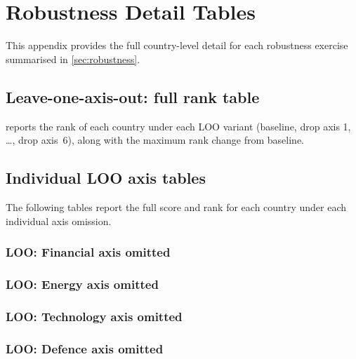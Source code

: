\section{Robustness Detail Tables}\label{app:robustness}

This appendix provides the full country-level detail for each
robustness exercise summarised in \cref{sec:robustness}.

\subsection{Leave-one-axis-out: full rank table}

 reports the rank of each country under each
LOO variant (baseline, drop axis 1, \ldots, drop axis~6), along with
the maximum rank change from baseline.



\subsection{Individual LOO axis tables}

The following tables report the full score and rank for each country
under each individual axis omission.

\subsubsection{LOO: Financial axis omitted}


\clearpage
\subsubsection{LOO: Energy axis omitted}


\clearpage
\subsubsection{LOO: Technology axis omitted}


\clearpage
\subsubsection{LOO: Defence axis omitted}


